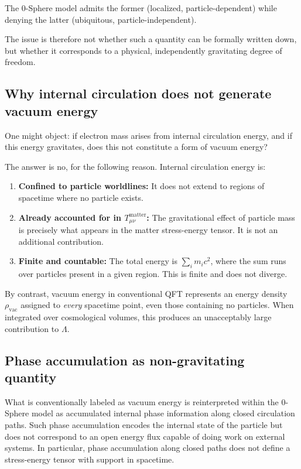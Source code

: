 \documentclass[12pt,letterpaper]{article}
\begin{document}
The 0-Sphere model admits the former (localized, particle-dependent) while denying the latter (ubiquitous, particle-independent).

The issue is therefore not whether such a quantity can be formally written down, but whether it corresponds to a physical, independently gravitating degree of freedom.

\subsection{Why internal circulation does not generate vacuum energy}

One might object: if electron mass arises from internal circulation energy, and if this energy gravitates, does this not constitute a form of vacuum energy?

The answer is no, for the following reason. Internal circulation energy is:

\begin{enumerate}
\item \textbf{Confined to particle worldlines:} It does not extend to regions of spacetime where no particle exists.

\item \textbf{Already accounted for in $T_{\mu\nu}^{\mathrm{matter}}$:} The gravitational effect of particle mass is precisely what appears in the matter stress-energy tensor. It is not an additional contribution.

\item \textbf{Finite and countable:} The total energy is $\sum_i m_i c^2$, where the sum runs over particles present in a given region. This is finite and does not diverge.
\end{enumerate}

By contrast, vacuum energy in conventional QFT represents an energy density $\rho_{\mathrm{vac}}$ assigned to \emph{every} spacetime point, even those containing no particles. When integrated over cosmological volumes, this produces an unacceptably large contribution to $\Lambda$.

\subsection{Phase accumulation as non-gravitating quantity}

What is conventionally labeled as vacuum energy is reinterpreted within the 0-Sphere model as accumulated internal phase information along closed circulation paths. Such phase accumulation encodes the internal state of the particle but does not correspond to an open energy flux capable of doing work on external systems. In particular, phase accumulation along closed paths does not define a stress-energy tensor with support in spacetime.
\end{document}
